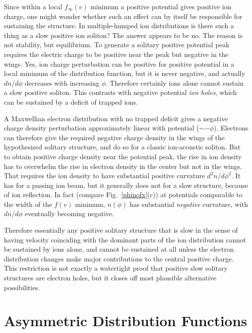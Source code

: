 \documentclass[12pt]{article}
\begin{document}
Since within a local $f_\infty(v)$ minimum a positive potential gives
positive ion charge, one might wonder whether such an effect can by
itself be responsible for sustaining the structure. In multiple-humped
ion distributions is there such a thing as a slow positive ion
soliton?  The answer appears to be no. The reason is not stability,
but equilibrium. To generate a solitary positive potential peak
requires the electric charge to be positive near the peak but
negative in the wings. Yes, ion charge perturbation can be positive for
positive potential in a local minimum of the distribution function,
but it is never negative, and actually $dn/d\phi$ decreases with
increasing $\phi$. Therefore certainly ions alone cannot sustain a
slow positive soliton. This contrasts with negative potential
\emph{ion holes}, which can be sustained by a deficit of trapped ions.

A Maxwellian electron distribution with no trapped deficit gives a
negative charge density perturbation approximately linear with
potential ($\sim -\phi$).  Electrons can therefore give the required
negative charge density in the wings of the hypothesized solitary
structure, and do so for a classic ion-acoustic soliton. But to obtain
positive charge density near the potential peak, the rise in ion
density has to overwhelm the rise in electron density in the center
but not in the wings. That requires the ion density to have
substantial positive curvature $d^2n/d\phi^2$. It has for a passing
ion beam, but it generally does not for a slow structure, because of
ion reflection. In fact (compare Fig.\ \ref{phinofx}(c)) at potentials
comparable to the width of the $f(v)$ minimum, $n(\phi)$ has
substantial \emph{negative} curvature, with $dn/d\phi$ eventually
becoming negative.

Therefore essentially any positive solitary structure that is slow in
the sense of having velocity coinciding with the dominant parts of the
ion distribution cannot be sustained by ions alone, and cannot be
sustained at all unless the electron distribution changes make major
contributions to the central positive charge. This restriction is not
exactly a watertight proof that positive slow solitary structures are
electron holes, but it closes off most plausible alternative possibilities.


\section{Asymmetric Distribution Functions}\label{sec2}
\end{document}
